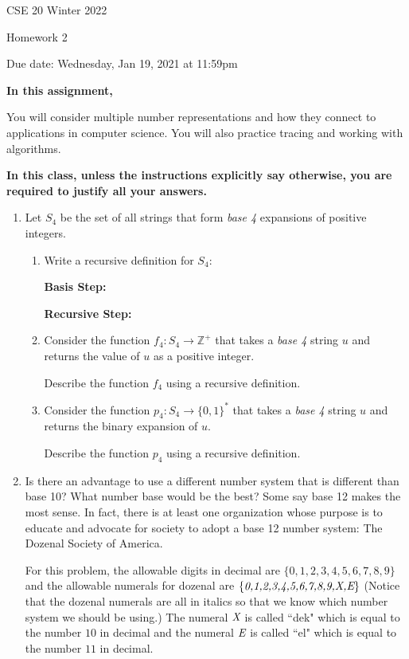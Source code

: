 \documentclass[10pt,letterpaper,unboxed,cm]{article}
\begin{document}
\hfill{CSE 20 Winter 2022}

\hfill{Homework 2}

\hfill{Due date: Wednesday, Jan 19, 2021 at 11:59pm}



{\bf In this assignment,}

You will consider multiple number representations and how they connect to applications in computer science. You will also practice tracing and working with algorithms.






\textbf{In this class, unless the instructions explicitly say otherwise, you are required to justify all your answers.}


\begin{enumerate}
	\item
	      Let $S_4$ be the set of all strings that form \emph{base 4} expansions of positive integers.

	      \begin{enumerate}
		      \item
		            Write a recursive definition for $S_4$:

		            {\bf Basis Step:}

		            {\bf Recursive Step:}


		      \item
		            Consider the function $f_4:S_4\to \mathbb{Z}^+$ that takes a \emph{base 4} string $u$ and returns the value of $u$ as a positive integer.

		            Describe the function $f_4$ using a recursive definition.

		      \item
		            Consider the function $p_4:S_4\to \{0,1\}^*$ that takes a \emph{base 4} string $u$ and returns the binary expansion of $u$.

		            Describe the function $p_4$ using a recursive definition.
	      \end{enumerate}

	\item
	      Is there an advantage to use a different number system that is different than base 10? What number base would be the best? Some say base 12 makes the most sense. In fact, there is at least one organization whose purpose is to educate and advocate for society to adopt a base 12 number system: The Dozenal Society of America.

	      For this problem, the allowable digits in decimal are $\{0,1,2,3,4,5,6,7,8,9\}$ and the allowable numerals for dozenal are $\{\emph{0,1,2,3,4,5,6,7,8,9,X,E}\}$ (Notice that the dozenal numerals are all in italics so that we know which number system we should be using.) The numeral $\emph{X}$ is called ``dek" which is equal to the number $10$ in decimal and the numeral $\emph{E}$ is called ``el" which is equal to the number $11$ in decimal.


\end{enumerate}
\end{document}
